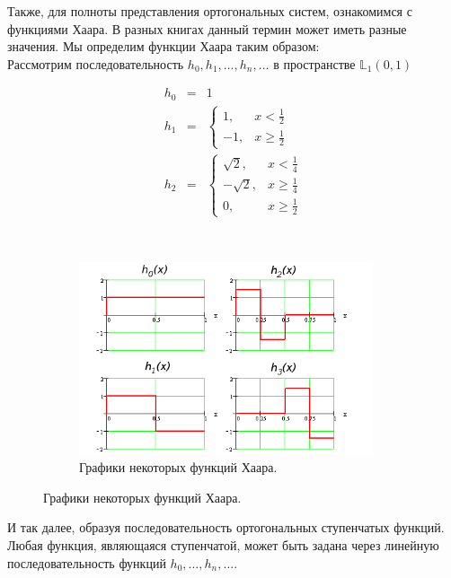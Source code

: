 \documentclass[12pt]{article}
\begin{document}
			Также, для полноты представления ортогональных систем, ознакомимся с функциями Хаара. В разных книгах данный термин
			может иметь разные значения. Мы определим функции Хаара таким образом: \\
			Рассмотрим последовательность $h_0, h_1, \dots, h_n, \dots$ в пространстве $\mathbb{L}_1(0, 1)$
	
			\begin{figure}[H]
				\begin{subfigure}[c]{0.45\textwidth}
				\vspace{-40pt}
				\begin{eqnarray*}
					h_0& =& 1 \\		
					h_1& =& 
					\begin{cases}
						1, & x < \frac{1}{2} \\
						-1, & x \geq \frac{1}{2}
					\end{cases} \\		
					h_2& =& 
					\begin{cases}
						\sqrt{2}, & x < \frac{1}{4} \\
						-\sqrt{2}, & x \geq \frac{1}{4} \\
						0, & x \geq \frac{1}{2}
					\end{cases}
				\end{eqnarray*}
				\end{subfigure}
				~
				\begin{subfigure}[c]{0.55\textwidth}
					\includegraphics[width=0.95\textwidth]{../Graphics/Lectures-5-Haar_functions.png}
					\caption{Графики некоторых функций Хаара.}
				\end{subfigure}
			\end{figure}
	
			И так далее, образуя последовательность ортогональных ступенчатых функций. Любая функция, являющаяся ступенчатой, может
			быть задана через линейную последовательность функций $h_0, \dots, h_n, \dots$.
\end{document}
